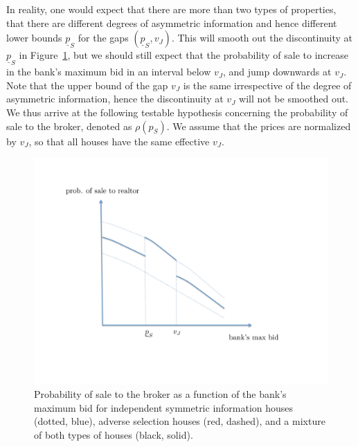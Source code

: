 \documentclass[11pt,twopage]{article}
\newcommand{\ul}{\underline}
\begin{document}
In reality, one would expect that there are more than two types of
properties, that there are different degrees of asymmetric information
and hence different lower bounds $\ul p_S$ for the gaps $(\ul
p_S,v_J)$. This will smooth out the discontinuity at $\ul p_S$ in
Figure~\ref{fig:theory-probability-of-sale}, but we should still
expect that the probability of sale to increase in the bank's maximum
bid in an interval below $v_J$, and jump downwards at $v_J$. Note that
the upper bound of the gap $v_J$ is the same irrespective of the
degree of asymmetric information, hence the discontinuity at $v_J$
will not be smoothed out.  We thus arrive at the following testable
hypothesis concerning the probability of sale to the broker, denoted
as $\rho(p_S)$. We assume that the prices are normalized by $v_J$, so
that all houses have the same effective $v_J$.
\begin{figure} %
  \centering
  \includegraphics[scale = 0.5]{graphics/prob_of_sale}
  \caption{Probability of sale to the broker as a function of the
    bank's maximum bid for independent symmetric information houses
    (dotted, blue), adverse selection houses (red, dashed), and a
    mixture of both types of houses (black, solid).}
  \label{fig:theory-probability-of-sale}
\end{figure}
\end{document}
